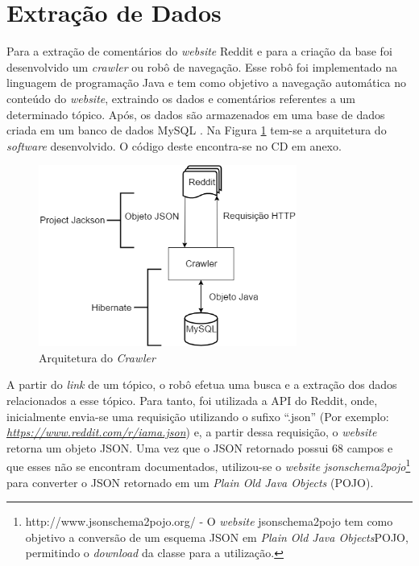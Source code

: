 \section{Extração de Dados}
\label{cap:Extracao}

Para a extração de comentários do \textit{website} Reddit e para a criação da
base foi desenvolvido um \textit{crawler} ou robô de navegação. Esse robô foi
implementado na linguagem de programação Java e tem como objetivo a navegação
automática no conteúdo do \textit{website}, extraindo os dados e comentários referentes a um
determinado tópico. Após, os dados são armazenados em uma base de dados criada
em um banco de dados MySQL \cite{Widenius:2002:MRM:560480}.
Na Figura \ref{fig:crawler} tem-se a arquitetura do \textit{software}
desenvolvido. O código deste encontra-se no CD em anexo.

\begin{figure}[htbp]
\centering
\includegraphics[height=225px]{imagens/arquitetura.png}
\caption{Arquitetura do \textit{Crawler}}
\label{fig:crawler}
\end{figure}

A partir do \textit{link} de um tópico, o robô efetua uma busca e a
extração dos dados relacionados a esse tópico. Para tanto, foi utilizada a
\ac{API} do Reddit, onde, inicialmente envia-se uma requisição utilizando o
sufixo ``.json'' (Por exemplo:
\textit{\url{https://www.reddit.com/r/iama.json}}) e, a partir dessa requisição,
o \textit{website} retorna um objeto \ac{JSON}. Uma vez que o \ac{JSON}
retornado possui 68 campos e que esses não se encontram
documentados, utilizou-se o \textit{website}
\textit{jsonschema2pojo}\footnote{http://www.jsonschema2pojo.org/ - O
\textit{website} jsonschema2pojo tem como objetivo a conversão de um esquema \ac{JSON} em
\textit{Plain Old Java Objects}\ac{POJO}, permitindo o \textit{download} da classe para a utilização.} para converter o
JSON retornado em um \textit{Plain Old Java Objects} (\ac{POJO}).

